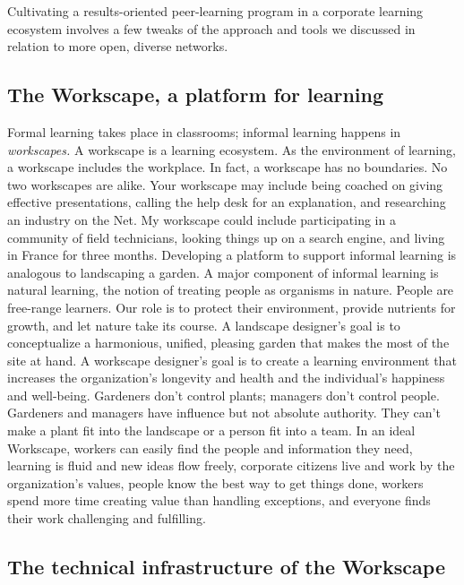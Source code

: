 Cultivating a results-oriented peer-learning program in a corporate
learning ecosystem involves a few tweaks of the approach and tools we
discussed in relation to more open, diverse networks.

\subsection{The Workscape, a platform for
learning}\label{the-workscape-a-platform-for-learning}

Formal learning takes place in classrooms; informal learning happens in
\emph{workscapes.} A workscape is a learning ecosystem. As the
environment of learning, a workscape includes the workplace. In fact, a
workscape has no boundaries. No two workscapes are alike. Your workscape
may include being coached on giving effective presentations, calling the
help desk for an explanation, and researching an industry on the Net. My
workscape could include participating in a community of field
technicians, looking things up on a search engine, and living in France
for three months. Developing a platform to support informal learning is
analogous to landscaping a garden. A major component of informal
learning is natural learning, the notion of treating people as organisms
in nature. People are free-range learners. Our role is to protect their
environment, provide nutrients for growth, and let nature take its
course. A landscape designer's goal is to conceptualize a harmonious,
unified, pleasing garden that makes the most of the site at hand. A
workscape designer's goal is to create a learning environment that
increases the organization's longevity and health and the individual's
happiness and well-being. Gardeners don't control plants; managers don't
control people. Gardeners and managers have influence but not absolute
authority. They can't make a plant fit into the landscape or a person
fit into a team. In an ideal Workscape, workers can easily find the
people and information they need, learning is fluid and new ideas flow
freely, corporate citizens live and work by the organization's values,
people know the best way to get things done, workers spend more time
creating value than handling exceptions, and everyone finds their work
challenging and fulfilling.

\subsection{The technical infrastructure of the
Workscape}\label{the-technical-infrastructure-of-the-workscape}

